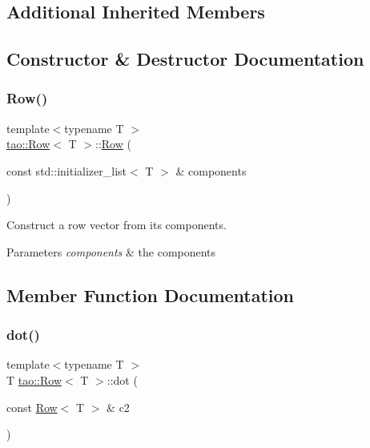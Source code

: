 \subsection*{Additional Inherited Members}


\subsection{Constructor \& Destructor Documentation}
\mbox{\label{classtao_1_1_row_ab097ce6742696ccf8966b757b9ad9480}} 
\subsubsection{\texorpdfstring{Row()}{Row()}}
{\footnotesize\ttfamily template$<$typename T $>$ \\
\mbox{\hyperlink{classtao_1_1_row}{tao\+::\+Row}}$<$ T $>$\+::\mbox{\hyperlink{classtao_1_1_row}{Row}} (\begin{DoxyParamCaption}\item[{const std\+::initializer\+\_\+list$<$ T $>$ \&}]{components }\end{DoxyParamCaption})}



Construct a row vector from its components. 


\begin{DoxyParams}{Parameters}
{\em components} & the components \\
\hline
\end{DoxyParams}


\subsection{Member Function Documentation}
\mbox{\label{classtao_1_1_row_a2201154700bd38327cdedaaa2a39273f}} 
\subsubsection{\texorpdfstring{dot()}{dot()}}
{\footnotesize\ttfamily template$<$typename T $>$ \\
T \mbox{\hyperlink{classtao_1_1_row}{tao\+::\+Row}}$<$ T $>$\+::dot (\begin{DoxyParamCaption}\item[{const \mbox{\hyperlink{classtao_1_1_row}{Row}}$<$ T $>$ \&}]{c2 }\end{DoxyParamCaption})}



